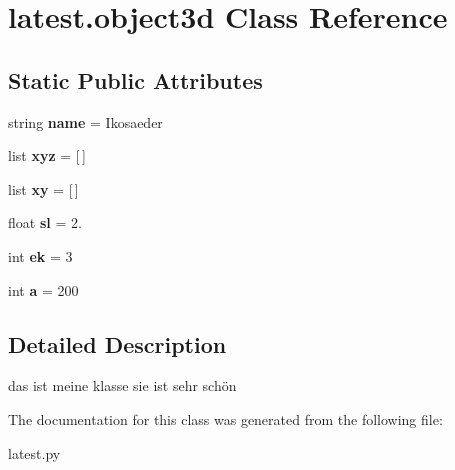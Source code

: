 \hypertarget{classlatest_1_1object3d}{}\section{latest.\+object3d Class Reference}
\label{classlatest_1_1object3d}
\subsection*{Static Public Attributes}
\begin{DoxyCompactItemize}
\item 
\mbox{\label{classlatest_1_1object3d_a64ba948b0b96df6c8d7eb5bdf84580c0}} 
string {\bfseries name} = \textquotesingle{}Ikosaeder\textquotesingle{}
\item 
\mbox{\label{classlatest_1_1object3d_aa3bd97b5ae076f3153cb54fd35ee6298}} 
list {\bfseries xyz} = \mbox{[}$\,$\mbox{]}
\item 
\mbox{\label{classlatest_1_1object3d_a2f8dba2d261aa928a0da8457a5029bef}} 
list {\bfseries xy} = \mbox{[}$\,$\mbox{]}
\item 
\mbox{\label{classlatest_1_1object3d_ac52da5036c787f364a36261fc0806aed}} 
float {\bfseries sl} = 2.
\item 
\mbox{\label{classlatest_1_1object3d_a1d158fb4c0998df397899fd01b6223ad}} 
int {\bfseries ek} = 3
\item 
\mbox{\label{classlatest_1_1object3d_a7906956edcb438206c22c237b189fe70}} 
int {\bfseries a} = 200
\end{DoxyCompactItemize}


\subsection{Detailed Description}
\begin{DoxyVerb}das ist meine klasse
sie ist sehr schön
\end{DoxyVerb}
 

The documentation for this class was generated from the following file\+:\begin{DoxyCompactItemize}
\item 
latest.\+py\end{DoxyCompactItemize}
